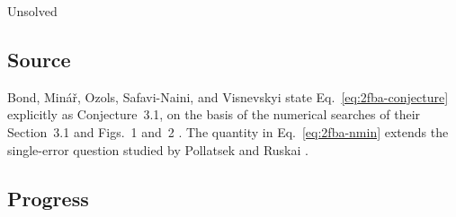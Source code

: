 Unsolved

\subsection*{Source}

Bond, Min\'a\v{r}, Ozols, Safavi-Naini, and Visnevskyi state
Eq.~\eqref{eq:2fba-conjecture} explicitly as Conjecture~3.1, on the basis of the
numerical searches of their Section~3.1 and Figs.~1 and~2
.  The quantity in
Eq.~\eqref{eq:2fba-nmin} extends the single-error question studied by Pollatsek
and Ruskai .

\subsection*{Progress}

